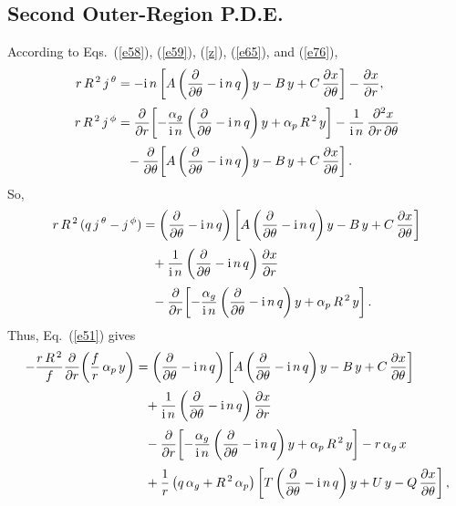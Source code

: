 \documentclass[12pt,prb,aps]{revtex4-1}
\begin{document}
\subsection{Second Outer-Region P.D.E.}
According to Eqs.~(\ref{e58}), (\ref{e59}), (\ref{z}), (\ref{e65}), and (\ref{e76}), 
\begin{align}
r\,R^{\,2}\,j^{\,\theta} &= -{\rm i}\,n\left[A\left(\frac{\partial}{\partial \theta}-{\rm i}\,n\,q\right)y-B\,y+C\,\frac{\partial x}{\partial\theta}\right]-\frac{\partial x}{\partial r},\\[0.5ex]
r\,R^{\,2}\,j^{\,\phi} &= \frac{\partial}{\partial r}\!\left[-\frac{\alpha_g}{{\rm i}\,n}\left(\frac{\partial}{\partial \theta}-{\rm i}\,n\,q\right)y+\alpha_p\,R^{\,2}\,y\right]-\frac{1}{{\rm i}\,n}\,\frac{\partial^2 x}{\partial r\,\partial\theta}\nonumber\\[0.5ex]&\phantom{=}-\frac{\partial}{\partial\theta}\!\left[A\left(\frac{\partial}{\partial \theta}-{\rm i}\,n\,q\right)y-B\,y+C\,\frac{\partial x}{\partial\theta}\right].
\end{align}
So,
\begin{align}
r\,R^{\,2}\,(q\,j^{\,\theta}-j^{\,\phi}) &=\left(\frac{\partial}{\partial\theta}-{\rm i}\,n\,q\right)\left[A\left(\frac{\partial}{\partial \theta}-{\rm i}\,n\,q\right)y-B\,y+C\,\frac{\partial x}{\partial\theta}\right]\nonumber\\[0.5ex]&\phantom= +\frac{1}{{\rm i}\,n}\left(\frac{\partial}{\partial\theta}-{\rm i}\,n\,q\right)\frac{\partial x}{\partial r} \nonumber\\[0.5ex]
&\phantom{=} -\frac{\partial}{\partial r}\!\left[-\frac{\alpha_g}{{\rm i}\,n}\left(\frac{\partial}{\partial \theta}-{\rm i}\,n\,q\right)y+\alpha_p\,R^{\,2}\,y\right].
\end{align}
Thus, Eq.~(\ref{e51}) gives
\begin{align}
-\frac{r\,R^{\,2}}{f}\frac{\partial}{\partial r}\!\left(\frac{f}{r}\,\alpha_p\,y\right)&=\left(\frac{\partial}{\partial\theta}-{\rm i}\,n\,q\right)\left[A\left(\frac{\partial}{\partial \theta}-{\rm i}\,n\,q\right)y-B\,y+C\,\frac{\partial x}{\partial\theta}\right]\nonumber\\[0.5ex]&\phantom= +\frac{1}{{\rm i}\,n}\left(\frac{\partial}{\partial\theta}-{\rm i}\,n\,q\right)\frac{\partial x}{\partial r} \nonumber\\[0.5ex]
&\phantom{=} -\frac{\partial}{\partial r}\!\left[-\frac{\alpha_g}{{\rm i}\,n}\left(\frac{\partial}{\partial \theta}-{\rm i}\,n\,q\right)y+\alpha_p\,R^{\,2}\,y\right]-r\,\alpha_g\,x\nonumber\\[0.5ex]
&\phantom{=} +\frac{1}{r}\left(q\,\alpha_g + R^{\,2}\,\alpha_p\right) \left[T\left(\frac{\partial}{\partial\theta}-{\rm i}\,n\,q\right)y + U\,y -Q\,\frac{\partial x}{\partial\theta}\right],
\end{align}
\end{document}
